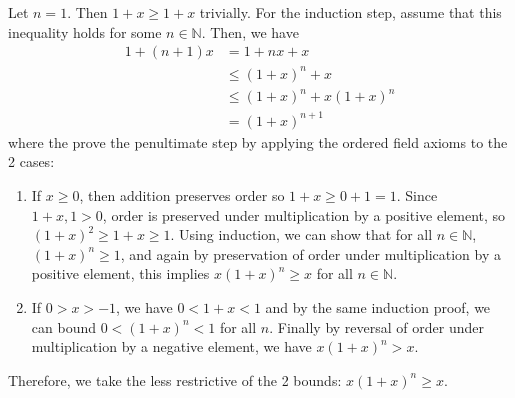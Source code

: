  \begin{exercise}
    Let $n = 1$. Then $1 + x \geq 1 + x$ trivially. For the induction step, assume that this inequality holds for some $n \in \mathbb{N}$. Then, we have 
    \begin{align}
      1 + (n+1) x & = 1 + nx + x \\
                  & \leq (1+x)^n + x \\ 
                  & \leq (1+x)^n + x(1+x)^n \\
                  & = (1+x)^{n+1}
    \end{align} 
    where the prove the penultimate step by applying the ordered field axioms to the 2 cases: 
    \begin{enumerate}
      \item If $x \geq 0$, then addition preserves order so $1 + x \geq 0 + 1 = 1$. Since $1 + x, 1 > 0$, order is preserved under multiplication by a positive element, so $(1+x)^2 \geq 1+x \geq 1$. Using induction, we can show that for all $n \in \mathbb{N}$, $(1+x)^n \geq 1$, and again by preservation of order under multiplication by a positive element, this implies $x (1 + x)^n \geq x$ for all $n \in \mathbb{N}$. 
      \item If $0 > x > -1$, we have $0 < 1 + x < 1$ and by the same induction proof, we can bound $0 < (1+x)^n < 1$ for all $n$. Finally by reversal of order under multiplication by a negative element, we have $x (1+x)^n > x$. 
    \end{enumerate}
    Therefore, we take the less restrictive of the 2 bounds: $x(1+x)^n \geq x$. 
  \end{exercise}

